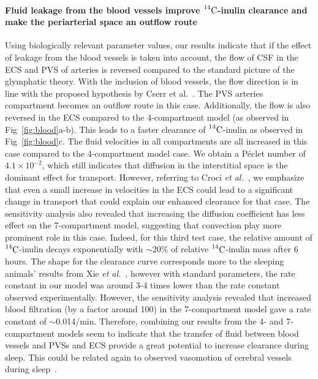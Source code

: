 \documentclass[a4paper,11pt]{article}
\newcommand{\etal}{\emph{et al.}\;}
\newcommand{\1}{^{(1)}}
\newcommand{\2}{^{(2)}}
\newcommand{\Cinulin}{$\prescript{14}{}{\text{C}}$-inulin }
\begin{document}
\paragraph{Fluid leakage from the blood vessels improve \Cinulin clearance and make the periarterial space an outflow route}
Using biologically relevant parameter values, our results indicate that if the effect of leakage from the blood vessels is taken into account, the flow of CSF in the ECS and PVS of arteries is reversed compared to the standard picture of the glymphatic theory. With the inclusion of blood vessels, the flow direction is in line with the proposed hypothesis by Cserr et al.~\cite{cserr1992drainage}. The PVS arteries compartment becomes an outflow route in this case. Additionally, the flow is also reversed in the ECS compared to the 4-compartment model (as observed in Fig~\ref{fig:blood}a-b). This leads to a faster clearance of \Cinulin as observed in Fig~\ref{fig:blood}c. 
The fluid velocities in all compartments are all increased in this case compared to the 4-compartment model case. We obtain a P\'eclet number of $4.1\times 10^{-2}$, which still indicates that diffusion in the interstitial space is the dominant effect for transport. However, referring to Croci \etal~\cite{croci2019uncertainty}, we emphasize that even a small increase in velocities in the ECS could lead to a significant change in transport that could explain our enhanced clearance for that case. The sensitivity analysis also revealed that increasing the diffusion coefficient has less effect on the 7-compartment model, suggesting that convection play more prominent role in this case.  
Indeed, for this third test case, the relative amount of \Cinulin decays exponentially with $\sim$20\% of relative \Cinulin mass after 6 hours. The shape for the clearance curve corresponds more to the sleeping animals' results from Xie \etal~\cite{Xie_2013_sleep}, however with standard parameters, the rate constant in our model was around 3-4 times lower than the rate constant observed experimentally. However, the sensitivity analysis revealed that increased blood filtration (by a factor around 100) in the 7-compartment model gave a rate constant of $\sim$0.014/min. Therefore, combining our results from the 4- and 7-compartment models seem to indicate that the transfer of fluid between blood vessels and PVSs and ECS provide a great potential to increase clearance during sleep. This could be related again to observed vasomotion of cerebral vessels during sleep~\cite{Bojarskaite2022}. 
\end{document}

